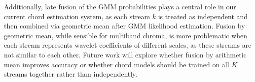 \documentclass{article}
\begin{document}
Additionally, late fusion of the GMM probabilities plays a central role in our current chord estimation system, as each stream $k$ is treated as independent and then combined via geometric mean after GMM likelihood estimation. Fusion by geometric mean, while sensible for multiband chroma, is more problematic when each stream represents wavelet coefficients of different scales, as these streams are not similar to each other. Future work will explore whether fusion by arithmetic mean improves accuracy or whether chord models should be trained on all $K$ streams together rather than independently. 



%

%
%
%
%
\end{document}
